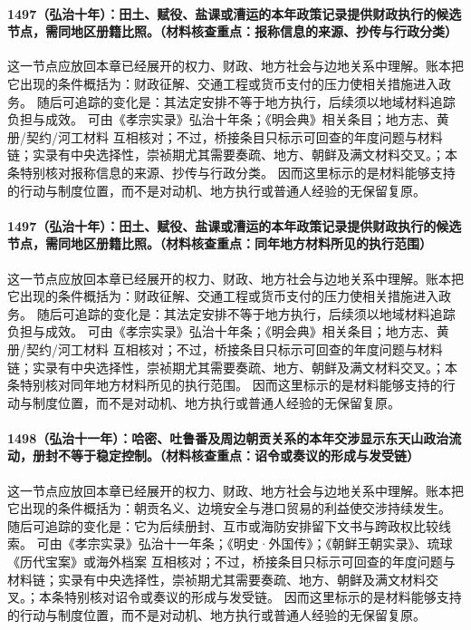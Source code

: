 \paragraph{1497（弘治十年）：田土、赋役、盐课或漕运的本年政策记录提供财政执行的候选节点，需同地区册籍比照。（材料核查重点：报称信息的来源、抄传与行政分类）} 这一节点应放回本章已经展开的权力、财政、地方社会与边地关系中理解。账本把它出现的条件概括为：财政征解、交通工程或货币支付的压力使相关措施进入政务。 随后可追踪的变化是：其法定安排不等于地方执行，后续须以地域材料追踪负担与成效。 可由《孝宗实录》弘治十年条；《明会典》相关条目；地方志、黄册/契约/河工材料 互相核对；不过，桥接条目只标示可回查的年度问题与材料链；实录有中央选择性，崇祯期尤其需要奏疏、地方、朝鲜及满文材料交叉。；本条特别核对报称信息的来源、抄传与行政分类。 因而这里标示的是材料能够支持的行动与制度位置，而不是对动机、地方执行或普通人经验的无保留复原。

\paragraph{1497（弘治十年）：田土、赋役、盐课或漕运的本年政策记录提供财政执行的候选节点，需同地区册籍比照。（材料核查重点：同年地方材料所见的执行范围）} 这一节点应放回本章已经展开的权力、财政、地方社会与边地关系中理解。账本把它出现的条件概括为：财政征解、交通工程或货币支付的压力使相关措施进入政务。 随后可追踪的变化是：其法定安排不等于地方执行，后续须以地域材料追踪负担与成效。 可由《孝宗实录》弘治十年条；《明会典》相关条目；地方志、黄册/契约/河工材料 互相核对；不过，桥接条目只标示可回查的年度问题与材料链；实录有中央选择性，崇祯期尤其需要奏疏、地方、朝鲜及满文材料交叉。；本条特别核对同年地方材料所见的执行范围。 因而这里标示的是材料能够支持的行动与制度位置，而不是对动机、地方执行或普通人经验的无保留复原。

\paragraph{1498（弘治十一年）：哈密、吐鲁番及周边朝贡关系的本年交涉显示东天山政治流动，册封不等于稳定控制。（材料核查重点：诏令或奏议的形成与发受链）} 这一节点应放回本章已经展开的权力、财政、地方社会与边地关系中理解。账本把它出现的条件概括为：朝贡名义、边境安全与港口贸易的利益使交涉持续发生。 随后可追踪的变化是：它为后续册封、互市或海防安排留下文书与跨政权比较线索。 可由《孝宗实录》弘治十一年条；《明史·外国传》；《朝鲜王朝实录》、琉球《历代宝案》或海外档案 互相核对；不过，桥接条目只标示可回查的年度问题与材料链；实录有中央选择性，崇祯期尤其需要奏疏、地方、朝鲜及满文材料交叉。；本条特别核对诏令或奏议的形成与发受链。 因而这里标示的是材料能够支持的行动与制度位置，而不是对动机、地方执行或普通人经验的无保留复原。

